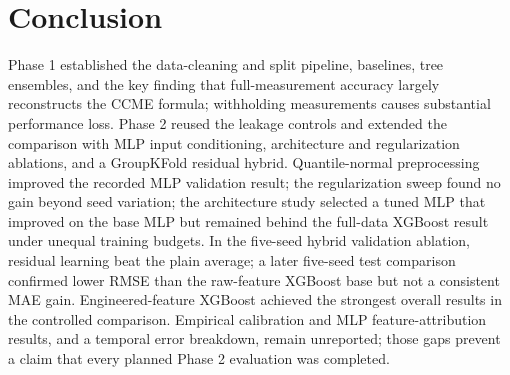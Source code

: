 \documentclass[conference]{IEEEtran}
\begin{document}
\section{Conclusion}
Phase 1 established the data-cleaning and split pipeline, baselines, tree ensembles, and the key finding that full-measurement accuracy largely reconstructs the CCME formula; withholding measurements causes substantial performance loss. Phase 2 reused the leakage controls and extended the comparison with MLP input conditioning, architecture and regularization ablations, and a GroupKFold residual hybrid. Quantile-normal preprocessing improved the recorded MLP validation result; the regularization sweep found no gain beyond seed variation; the architecture study selected a tuned MLP that improved on the base MLP but remained behind the full-data XGBoost result under unequal training budgets. In the five-seed hybrid validation ablation, residual learning beat the plain average; a later five-seed test comparison confirmed lower RMSE than the raw-feature XGBoost base but not a consistent MAE gain. Engineered-feature XGBoost achieved the strongest overall results in the controlled comparison. Empirical calibration and MLP feature-attribution results, and a temporal error breakdown, remain unreported; those gaps prevent a claim that every planned Phase 2 evaluation was completed.



\end{document}
